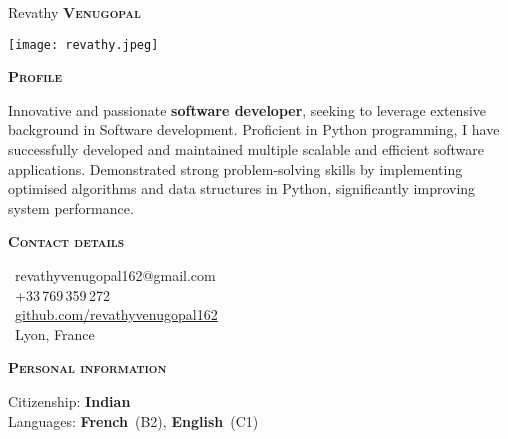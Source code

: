 \documentclass[11pt, a4paper]{article}
\newcommand{\headleft}[1]{\vspace*{3ex}\textsc{\textbf{#1}}\par%
    \vspace*{-1.5ex}\hrulefill\par\vspace*{0.7ex}}
\begin{document}
\setlength{\topskip}{0pt}
\setlength{\parindent}{0pt}
\setlength{\parskip}{0pt}
\setlength{\fboxsep}{0pt}
\pagestyle{empty}
\raggedbottom

\begin{minipage}[t]{0.33\textwidth} %
\colorbox{cvblue}{\begin{minipage}[t][5mm][t]{\textwidth}\null\hfill\null\end{minipage}}

\vspace{-.2ex} %
\colorbox{cvblue!90}{\color{white}  %
\textwidth\relax%
\begin{minipage}[t][293mm][t]{0.82\textwidth}
\raggedright
\vspace*{2.5ex}

\Large Revathy \textbf{\textsc{Venugopal}} \normalsize 

\null\hfill\texttt{[image: revathy.jpeg]}\hfill\null

\vspace*{0.5ex} %

\headleft{Profile}
Innovative and passionate \textbf{software developer}, seeking to leverage extensive background in Software development.
Proficient in Python programming, I have successfully developed and maintained multiple scalable and efficient software applications.
Demonstrated strong problem-solving skills by implementing optimised algorithms and data structures in Python, significantly improving system performance.

\headleft{Contact details}
\small %
\MVAt\ {\small revathyvenugopal162@gmail.com} \\[0.4ex]
\Mobilefone\ +33\,769\,359\,272 \\[0.5ex]
\Mundus\ \href{https://github.com/Revathyvenugopal162}{github.com/revathyvenugopal162} \\[0.1ex]
\Letter\ Lyon, France
\normalsize

\headleft{Personal information}
Citizenship: \textbf{Indian} \\[0.5ex]
Languages: \textbf{French}~(B2), \textbf{English}~(C1)

\end{minipage}%
\textwidth\relax%
}
\end{minipage}%
\end{document}
